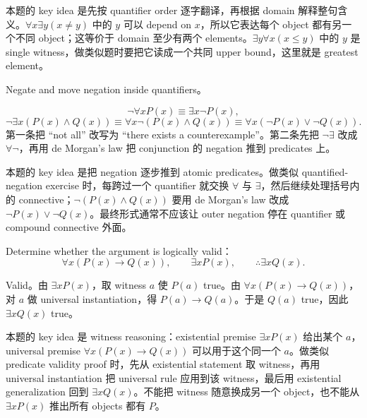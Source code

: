 \begin{explanation}
本题的 key idea 是先按 quantifier order 逐字翻译，再根据 domain 解释整句含义。\(\forall x\exists y(x\ne y)\) 中的 \(y\) 可以 depend on \(x\)，所以它表达每个 object 都有另一个不同 object；这等价于 domain 至少有两个 elements。\(\exists y\forall x(x\le y)\) 中的 \(y\) 是 single witness，做类似题时要把它读成一个共同 upper bound，这里就是 greatest element。
\end{explanation}

\begin{exerciseblock}
Negate and move negation inside quantifiers。
\end{exerciseblock}

\begin{solution}
\[
\lnot\forall xP(x)\equiv\exists x\lnot P(x),
\]
\[
\lnot\exists x(P(x)\land Q(x))\equiv\forall x\lnot(P(x)\land Q(x))
\equiv\forall x(\lnot P(x)\lor\lnot Q(x)).
\]
第一条把 ``not all'' 改写为 ``there exists a counterexample''。第二条先把 \(\lnot\exists\) 改成 \(\forall\lnot\)，再用 de Morgan's law 把 conjunction 的 negation 推到 predicates 上。
\end{solution}

\begin{explanation}
本题的 key idea 是把 negation 逐步推到 atomic predicates。做类似 quantified-negation exercise 时，每跨过一个 quantifier 就交换 \(\forall\) 与 \(\exists\)，然后继续处理括号内的 connective；\(\lnot(P(x)\land Q(x))\) 要用 de Morgan's law 改成 \(\lnot P(x)\lor\lnot Q(x)\)。最终形式通常不应该让 outer negation 停在 quantifier 或 compound connective 外面。
\end{explanation}

\begin{exerciseblock}
Determine whether the argument is logically valid：
\[
\forall x(P(x)\to Q(x)),\qquad \exists xP(x),\qquad \therefore \exists xQ(x).
\]
\end{exerciseblock}

\begin{solution}
Valid。由 \(\exists xP(x)\)，取 witness \(a\) 使 \(P(a)\) true。由 \(\forall x(P(x)\to Q(x))\)，对 \(a\) 做 universal instantiation，得 \(P(a)\to Q(a)\)。于是 \(Q(a)\) true，因此 \(\exists xQ(x)\) true。
\end{solution}

\begin{explanation}
本题的 key idea 是 witness reasoning：existential premise \(\exists xP(x)\) 给出某个 \(a\)，universal premise \(\forall x(P(x)\to Q(x))\) 可以用于这个同一个 \(a\)。做类似 predicate validity proof 时，先从 existential statement 取 witness，再用 universal instantiation 把 universal rule 应用到该 witness，最后用 existential generalization 回到 \(\exists xQ(x)\)。不能把 witness 随意换成另一个 object，也不能从 \(\exists xP(x)\) 推出所有 objects 都有 \(P\)。
\end{explanation}
